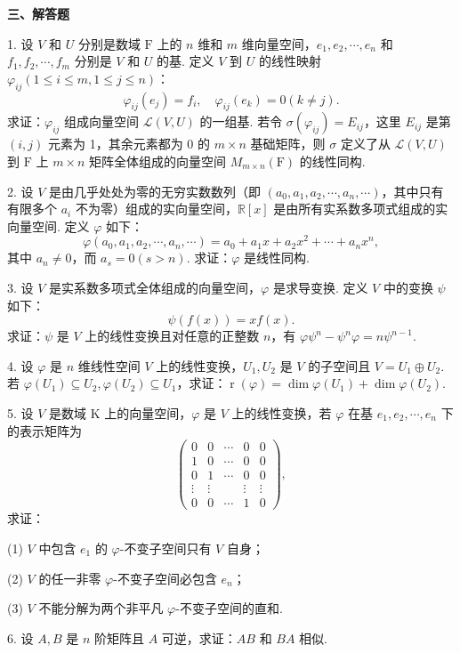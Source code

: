\documentclass[UTF8, 12pt, fontset=fandol, oneside]{ctexart}
\begin{document}
\noindent\textbf{三、解答题}

1. 设 $V$ 和 $U$ 分别是数域 $\mathrm{F}$ 上的 $n$ 维和 $m$ 维向量空间，$e_1,e_2,\cdots,e_n$ 和 $f_1,f_2,\cdots,f_m$ 分别是 $V$ 和 $U$ 的基. 定义 $V$ 到 $U$ 的线性映射 $\varphi_{ij}(1\le i\le m,1\le j\le n)$：
\[
\varphi_{ij}(e_j)=f_i,\quad \varphi_{ij}(e_k)=0(k\ne j).
\]
求证：$\varphi_{ij}$ 组成向量空间 $\mathcal{L}(V,U)$ 的一组基. 若令 $\sigma(\varphi_{ij})=E_{ij}$，这里 $E_{ij}$ 是第 $(i,j)$ 元素为 1，其余元素都为 0 的 $m\times n$ 基础矩阵，则 $\sigma$ 定义了从 $\mathcal{L}(V,U)$ 到 $\mathrm{F}$ 上 $m\times n$ 矩阵全体组成的向量空间 $M_{m\times n}(\mathrm{F})$ 的线性同构.

2. 设 $V$ 是由几乎处处为零的无穷实数数列（即 $(a_0,a_1,a_2,\cdots,a_n,\cdots)$，其中只有有限多个 $a_i$ 不为零）组成的实向量空间，$\mathbb{R}[x]$ 是由所有实系数多项式组成的实向量空间. 定义 $\varphi$ 如下：
\[
\varphi(a_0,a_1,a_2,\cdots,a_n,\cdots)=a_0+a_1x+a_2x^2+\cdots+a_nx^n,
\]
其中 $a_n\ne0$，而 $a_s=0(s>n)$. 求证：$\varphi$ 是线性同构.

3. 设 $V$ 是实系数多项式全体组成的向量空间，$\varphi$ 是求导变换. 定义 $V$ 中的变换 $\psi$ 如下：
\[
\psi(f(x))=xf(x).
\]
求证：$\psi$ 是 $V$ 上的线性变换且对任意的正整数 $n$，有 $\varphi\psi^n-\psi^n\varphi=n\psi^{n-1}$.

4. 设 $\varphi$ 是 $n$ 维线性空间 $V$ 上的线性变换，$U_1,U_2$ 是 $V$ 的子空间且 $V=U_1\oplus U_2$. 若 $\varphi(U_1)\subseteq U_2,\varphi(U_2)\subseteq U_1$，求证：$\operatorname{r}(\varphi)=\dim\varphi(U_1)+\dim\varphi(U_2)$.

5. 设 $V$ 是数域 $\mathrm{K}$ 上的向量空间，$\varphi$ 是 $V$ 上的线性变换，若 $\varphi$ 在基 $e_1,e_2,\cdots,e_n$ 下的表示矩阵为
\[
\left(\begin{array}{ccccc}
0 & 0 & \cdots & 0 & 0\\
1 & 0 & \cdots & 0 & 0\\
0 & 1 & \cdots & 0 & 0\\
\vdots & \vdots &        & \vdots & \vdots\\
0 & 0 & \cdots & 1 & 0
\end{array}\right),
\]
求证：

(1) $V$ 中包含 $e_1$ 的 $\varphi$-不变子空间只有 $V$ 自身；

(2) $V$ 的任一非零 $\varphi$-不变子空间必包含 $e_n$；

(3) $V$ 不能分解为两个非平凡 $\varphi$-不变子空间的直和.

6. 设 $A,B$ 是 $n$ 阶矩阵且 $A$ 可逆，求证：$AB$ 和 $BA$ 相似.
\end{document}
